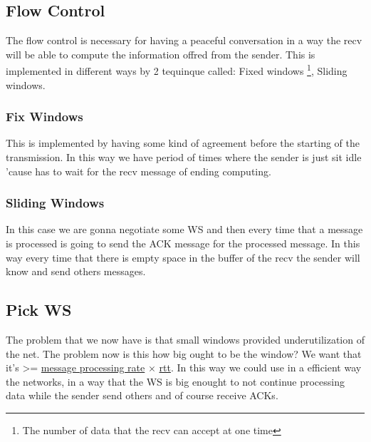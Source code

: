 \documentclass{article}
\begin{document}
    \subsection{Flow Control}
      The flow control is necessary for having a peaceful conversation in a way the recv will be
      able to compute the information offred from the sender. This is implemented in different 
      ways by 2 tequinque called: Fixed windows \footnote{The number of data that the recv can
      accept at one time}, Sliding windows.
      \subsubsection{Fix Windows}
        This is implemented by having some kind of agreement before the starting of the 
        transmission. In this way we have period of times where the sender is just sit
        idle 'cause has to wait for the recv message of ending computing.
      \subsubsection{Sliding Windows}
        In this case we are gonna negotiate some WS and then every time that a message is
        processed is going to send the ACK message for the processed message. In this way
        every time that there is empty space in the buffer of the recv the sender will know
        and send others messages. 
    \subsection{Pick WS} 
      The problem that we now have is that small windows provided underutilization of the net.
      The problem now is this how big ought to be the window? We want that it's >= 
      \underline{message processing rate} $\times$ \underline{rtt}. In this way we could use 
      in a efficient way the networks, in a way that the WS is big enought to not continue
      processing data while the sender send others and of course receive ACKs. 
\end{document}
